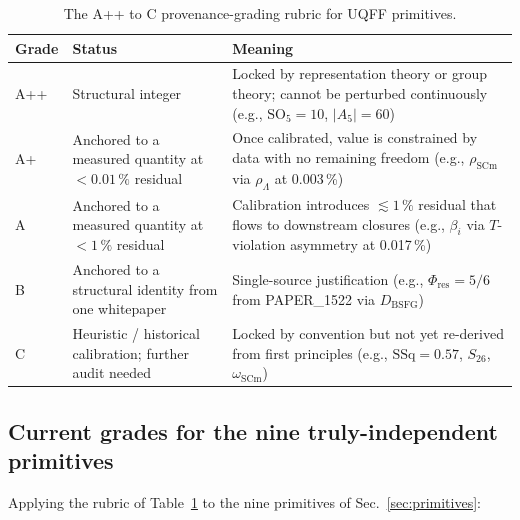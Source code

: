 \begin{table}[H]
\centering
\caption{The A++ to C provenance-grading rubric for UQFF primitives.}
\label{tab:provenance_rubric}
\begin{tabular}{l l p{8cm}}
\toprule
\textbf{Grade} & \textbf{Status} & \textbf{Meaning} \\
\midrule
A++ & Structural integer & Locked by representation theory or group theory; cannot be perturbed continuously (e.g., $\mathrm{SO}_5 = 10$, $|A_5| = 60$) \\
A+ & Anchored to a measured quantity at $<0.01\,\%$ residual & Once calibrated, value is constrained by data with no remaining freedom (e.g., $\rho_{\text{SCm}}$ via $\rho_\Lambda$ at 0.003\,\%) \\
A & Anchored to a measured quantity at $<1\,\%$ residual & Calibration introduces $\lesssim 1\,\%$ residual that flows to downstream closures (e.g., $\beta_i$ via $T$-violation asymmetry at 0.017\,\%) \\
B & Anchored to a structural identity from one whitepaper & Single-source justification (e.g., $\Phi_{\text{res}} = 5/6$ from PAPER\_1522 via $D_{\text{BSFG}}$) \\
C & Heuristic / historical calibration; further audit needed & Locked by convention but not yet re-derived from first principles (e.g., $\mathrm{SSq} = 0.57$, $S_{26}$, $\omega_{\text{SCm}}$) \\
\bottomrule
\end{tabular}
\end{table}

\subsection{Current grades for the nine truly-independent primitives}
\label{sec:current_grades}

Applying the rubric of Table~\ref{tab:provenance_rubric} to the
nine primitives of Sec.~\ref{sec:primitives}:

